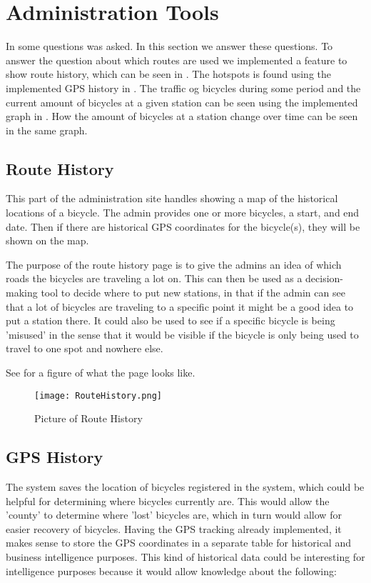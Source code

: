 \section{Administration Tools}
In  some questions was asked. 
In this section we answer these questions.
To answer the question about which routes are used we implemented a feature to show route history, which can be seen in .
The hotspots is found using the implemented GPS history in .
The traffic og bicycles during some period and the current amount of bicycles at a given station can be seen using the implemented graph in .
How the amount of bicycles at a station change over time can be seen in the same graph.

\subsection{Route History}\label{sec:routeHistory}
This part of the administration site handles showing a map of the historical locations of a bicycle.
The admin provides one or more bicycles, a start, and end date.
Then if there are historical GPS coordinates for the bicycle(s), they will be shown on the map. 

The purpose of the route history page is to give the admins an idea of which roads the bicycles are traveling a lot on. 
This can then be used as a decision-making tool to decide where to put new stations, in that if the admin can see that a lot of bicycles are traveling to a specific point it might be a good idea to put a station there.
It could also be used to see if a specific bicycle is being 'misused' in the sense that it would be visible if the bicycle is only being used to travel to one spot and nowhere else.

See  for a figure of what the page looks like.

\begin{figure}[H]
	\centering
	\texttt{[image: RouteHistory.png]}
	\caption{Picture of Route History}
	\label{fig:routehistory}
\end{figure}

\subsection{GPS History}\label{sec:gpsHistory}
The system saves the location of bicycles registered in the system, which could be helpful for determining where bicycles currently are. 
This would allow the 'county' to determine where 'lost' bicycles are, which in turn would allow for easier recovery of bicycles.
Having the GPS tracking already implemented, it makes sense to store the GPS coordinates in a separate table for historical and business intelligence purposes.
This kind of historical data could be interesting for intelligence purposes because it would allow knowledge about the following:

